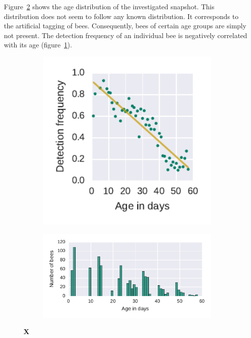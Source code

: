 Figure~\ref{fig:n3ageDist} shows the age distribution of the investigated snapshot. This distribution does not seem to follow any known distribution. It corresponds to the artificial tagging of bees. Consequently, bees of certain age groups are simply not present. The detection frequency of an individual bee is negatively correlated with its age (figure~\ref{fig:n3detfVSage}).


\begin{figure}[htb]
	\centering
	\begin{subfigure}[b]{0.33\textwidth}
	\centering
	\includegraphics[width=1.0\textwidth]{Figures/n3_detFvsAge}
	\caption[]{}
	\label{fig:n3detfVSage}
	\end{subfigure} 
	\begin{subfigure}[b]{0.66\textwidth}
	\centering
	\includegraphics[width=1.0\textwidth]{Figures/n3_ages.pdf}
	\caption[]{}
	\label{fig:n3ageDist}
	\end{subfigure}
	\caption[X]{\textbf{X}}
	\label{fig:ageDetF}
\end{figure}

